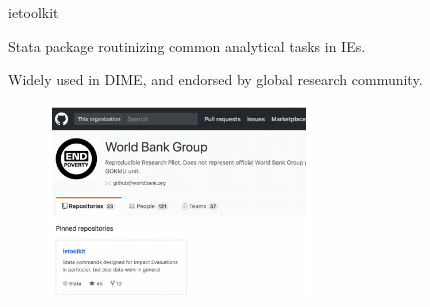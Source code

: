 \documentclass[aspectratio=169]{beamer}
\begin{document}
\begin{frame}[fragile]{ietoolkit}
\begin{multicols}{2}	
	
	Stata package routinizing common analytical tasks in IEs.
	
	Widely used in DIME, and endorsed by global research community.
	
	\begin{figure}
		\centering
		\includegraphics[width=70mm, right]{img/Resources4}
	\end{figure}
	
\end{multicols}
\end{frame}
\end{document}
